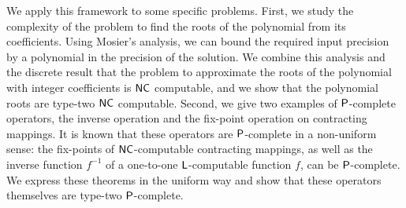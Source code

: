 \begin{eabstract}
We apply this framework to some specific problems.
First, we study the complexity of the problem to find the roots of
the polynomial from its coefficients.
Using Mosier's analysis, we can bound the required input precision 
by a polynomial in the precision of the solution.
We combine this analysis and the discrete result 
that the problem to approximate the roots of the polynomial with integer 
coefficients is $\mathsf{NC}$ computable,
and we show that the polynomial roots are type-two $\mathsf{NC}$ computable.
Second, we give two examples of $\mathsf{P}$-complete operators,
the inverse operation and the fix-point operation on contracting mappings.
It is known that these operators are $\mathsf{P}$-complete in a non-uniform sense:
the fix-points of $\mathsf{NC}$-computable contracting mappings,
as well as the inverse function $f^{-1}$ of a one-to-one $\mathsf{L}$-computable function $f$,
can be $\mathsf{P}$-complete.
We express these theorems in the uniform way and
show that these operators themselves are type-two $\mathsf{P}$-complete.
\end{eabstract}


